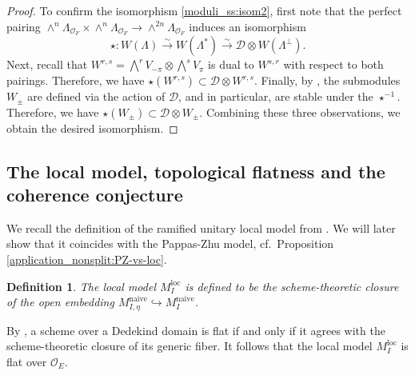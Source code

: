 \documentclass[pdflatex,sn-mathphys-num]{sn-jnl}%
\theoremstyle{thmstyleone}%
\theoremstyle{thmstyletwo}%
\numberwithin{equation}{subsection}
\theoremstyle{thmstylethree}%
\newtheorem{definition}[subsubsection]{Definition}%
\newcommand{\CD}{\ensuremath{\mathcal{D}}\xspace}
\newcommand{\CO}{\ensuremath{\mathcal{O}}\xspace}
\newcommand{\loc}{\ensuremath{\mathrm{loc}}\xspace}
\newcommand{\naive}{\ensuremath{\mathrm{naive}}\xspace}
\begin{document}
\begin{proof}
To confirm the isomorphism \eqref{moduli_ss:isom2}, first note that the perfect pairing $\wedge^n\Lambda_{\CO_F}\times\wedge^n\Lambda_{\CO_F}\rightarrow\wedge^{2n}\Lambda_{\CO_F}$ induces an isomorphism
\begin{equation*}
    \star:W(\Lambda)\xrightarrow{\sim} W(\Lambda^*)\xrightarrow{\sim}\CD\otimes W(\Lambda^\perp).
\end{equation*}
Next, recall that $W^{r,s}=\bigwedge^r V_{-\pi}\otimes \bigwedge^s V_\pi$ is dual to $W^{s,r}$ with respect to both pairings. Therefore, we have $\star(W^{r,s})\subset\CD\otimes W^{r,s}$.
Finally, by \cite[\S 7.1.3]{PR2009}, the submodules $W_\pm$ are defined via the action of  $\CD$, and in particular, are stable under the $\star^{-1}$. Therefore, we have $\star(W_\pm)\subset \CD\otimes W_{\pm}$.
Combining these three observations, we obtain the desired isomorphism.
\end{proof}
		
\subsection{The local model, topological flatness and the coherence conjecture}\label{moduli_fc}
We recall the definition of the ramified unitary local model from \cite[\S 11]{PR2008}. 
We will later show that it coincides with the Pappas-Zhu model, cf.\ Proposition \ref{application_nonsplit:PZ-vs-loc}.
\begin{definition}
	The local model $M_I^\loc$ is defined to be the scheme-theoretic closure of the open embedding $M_{I,\eta}^\naive\hookrightarrow M_I^\naive$.
\end{definition}
By \cite[Proposition 14.14]{GW2020}, a scheme over a Dedekind domain is flat if and only if it agrees with the scheme-theoretic closure of its generic fiber. 
It follows that the local model $M^\loc_I$ is flat over $\CO_E$.     
\end{document}
